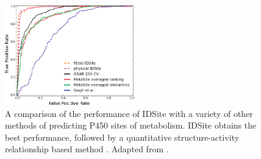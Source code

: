 \begin{figure}[h!]
\centering
\includegraphics[width=0.5\textwidth]{figures/idsite/roc_other_methods.png}
\caption{A comparison of the performance of IDSite with a variety of other methods of predicting P450 sites of metabolism.
IDSite obtains the best performance, followed by a quantitative structure-activity relationship based method \protect\cite{sheridan2007empirical}.
Adapted from \protect\cite{sheridan2007empirical}.
}
\label{figure:idsite_other}
\end{figure}
